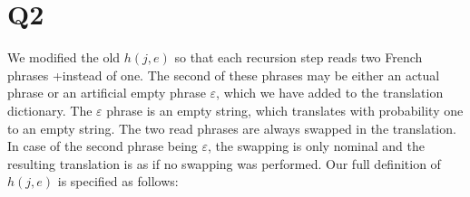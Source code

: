 \section*{Q2}
We modified the old $h(j,e)$ so that each recursion step reads two French
phrases +instead of one. The second of these phrases may be either an actual
phrase or an artificial  empty phrase $\varepsilon$, which we have added to
the translation dictionary. The $\varepsilon$ phrase is an empty string,
which translates with probability one to an empty string. The two read
phrases are always swapped in the translation. In case of the second phrase
being $\varepsilon$, the swapping is only nominal and the resulting
translation is as if no swapping was performed.  Our full definition of
$h(j,e)$ is specified as follows:


